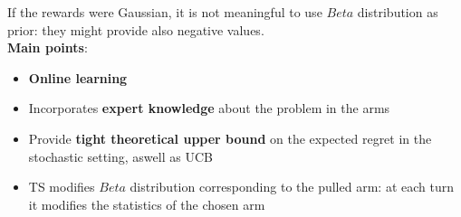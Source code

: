     If the rewards were Gaussian, it is not meaningful to use $Beta$ distribution as prior: they might provide also negative values.\\
    \textbf{Main points}:
    \begin{itemize}
        \item \textbf{Online learning}
        \item Incorporates \textbf{expert knowledge} about the problem in the arms
        \item Provide \textbf{tight theoretical upper bound} on the expected regret in the stochastic setting, aswell as UCB
        \item TS modifies $Beta$ distribution corresponding to the pulled arm: at each turn it modifies the statistics of the chosen arm
    \end{itemize}